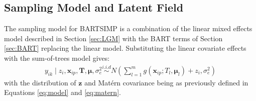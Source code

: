 \documentclass[preprint,12pt,authoryear]{elsarticle}
\begin{document}
{\subsection{Sampling Model and Latent Field}
\label{sec:SBART}
The sampling model for BARTSIMP is a combination of the linear mixed effects model described in Section \ref{sec:LGM} with the BART terms of Section \ref{sec:BART} replacing the linear model. Substituting the linear covariate effects with the sum-of-trees model gives: 
\begin{align*}
	y_{ik} \mid z_i, \boldsymbol{x}_{i p}, \mathbf{T}, \boldsymbol{\mu}, \sigma_e^2 \stackrel{i . i . d}{\sim} N\left(\sum_{l=1}^m g\left(\boldsymbol{x}_{i p} ; T_l, \boldsymbol{\mu}_l\right)+z_i, \sigma_e^2\right)
\end{align*}
with the distribution of $\boldsymbol{z}$ and Mat\'ern covariance being as previously defined in Equations \eqref{eq:model} and \eqref{eq:matern}.

}
\end{document}
